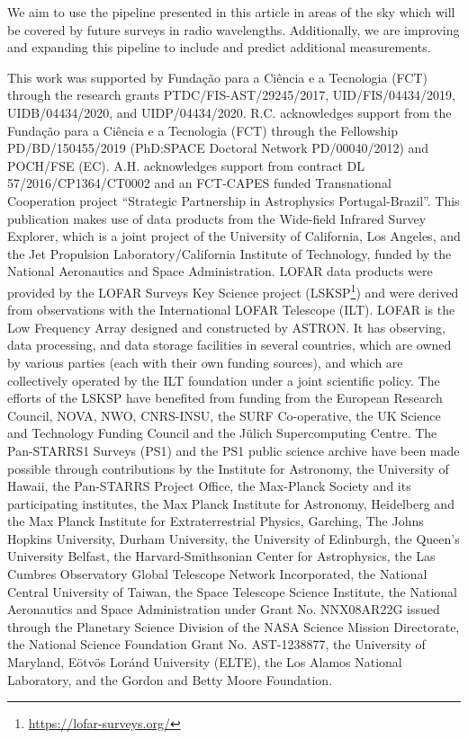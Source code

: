 \documentclass{aa}
\begin{document}
We aim to use the pipeline presented in this article in areas of the sky which will be covered by future surveys in radio wavelengths. Additionally, we are improving and expanding this pipeline to include and predict additional measurements.

\begin{acknowledgements}
This work was supported by Fundação para a Ciência e a Tecnologia (FCT) through the research grants PTDC/FIS-AST/29245/2017, UID/FIS/04434/2019, UIDB/04434/2020, and UIDP/04434/2020. R.C. acknowledges support from the Fundação para a Ciência e a Tecnologia (FCT) through the Fellowship PD/BD/150455/2019 (PhD:SPACE Doctoral Network PD/00040/2012) and POCH/FSE (EC). A.H. acknowledges support from contract DL 57/2016/CP1364/CT0002 and an FCT-CAPES funded Transnational Cooperation project ``Strategic Partnership in Astrophysics Portugal-Brazil''.
This publication makes use of data products from the Wide-field Infrared Survey Explorer, which is a joint project of the University of California, Los Angeles, and the Jet Propulsion Laboratory/California Institute of Technology, funded by the National Aeronautics and Space Administration.
LOFAR data products were provided by the LOFAR Surveys Key Science project (LSKSP\footnote{\url{https://lofar-surveys.org/}}) and were derived from observations with the International LOFAR Telescope (ILT). LOFAR \citep{2013A&A...556A...2V} is the Low Frequency Array designed and constructed by ASTRON. It has observing, data processing, and data storage facilities in several countries, which are owned by various parties (each with their own funding sources), and which are collectively operated by the ILT foundation under a joint scientific policy. The efforts of the LSKSP have benefited from funding from the European Research Council, NOVA, NWO, CNRS-INSU, the SURF Co-operative, the UK Science and Technology Funding Council and the Jülich Supercomputing Centre.
The Pan-STARRS1 Surveys (PS1) and the PS1 public science archive have been made possible through contributions by the Institute for Astronomy, the University of Hawaii, the Pan-STARRS Project Office, the Max-Planck Society and its participating institutes, the Max Planck Institute for Astronomy, Heidelberg and the Max Planck Institute for Extraterrestrial Physics, Garching, The Johns Hopkins University, Durham University, the University of Edinburgh, the Queen's University Belfast, the Harvard-Smithsonian Center for Astrophysics, the Las Cumbres Observatory Global Telescope Network Incorporated, the National Central University of Taiwan, the Space Telescope Science Institute, the National Aeronautics and Space Administration under Grant No. NNX08AR22G issued through the Planetary Science Division of the NASA Science Mission Directorate, the National Science Foundation Grant No. AST-1238877, the University of Maryland, E\"{o}tv\"{o}s Lor\'{a}nd University (ELTE), the Los Alamos National Laboratory, and the Gordon and Betty Moore Foundation.

\end{acknowledgements}
\end{document}
